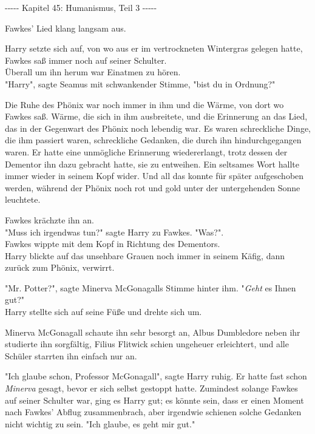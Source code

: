 

\hypertarget{humanismus-teil-3}{%

-\/-\/-\/-\/- Kapitel 45: Humanismus, Teil 3 -\/-\/-\/-\/-

Fawkes' Lied klang langsam aus.

Harry setzte sich auf, von wo aus er im vertrockneten Wintergras gelegen hatte, Fawkes saß immer noch auf seiner Schulter.\\ Überall um ihn herum war Einatmen zu hören.\\ "Harry", sagte Seamus mit schwankender Stimme, "bist du in Ordnung?"

Die Ruhe des Phönix war noch immer in ihm und die Wärme, von dort wo Fawkes saß. Wärme, die sich in ihm ausbreitete, und die Erinnerung an das Lied, das in der Gegenwart des Phönix noch lebendig war. Es waren schreckliche Dinge, die ihm passiert waren, schreckliche Gedanken, die durch ihn hindurchgegangen waren. Er hatte eine unmögliche Erinnerung wiedererlangt, trotz dessen der Dementor ihn dazu gebracht hatte, sie zu entweihen. Ein seltsames Wort hallte immer wieder in seinem Kopf wider. Und all das konnte für später aufgeschoben werden, während der Phönix noch rot und gold unter der untergehenden Sonne leuchtete.

Fawkes krächzte ihn an.\\ "Muss ich irgendwas tun?" sagte Harry zu Fawkes. "Was?".\\ Fawkes wippte mit dem Kopf in Richtung des Dementors.\\ Harry blickte auf das unsehbare Grauen noch immer in seinem Käfig, dann zurück zum Phönix, verwirrt.

"Mr. Potter?", sagte Minerva McGonagalls Stimme hinter ihm. "\emph{Geht} es Ihnen gut?"\\ Harry stellte sich auf seine Füße und drehte sich um.

Minerva McGonagall schaute ihn sehr besorgt an, Albus Dumbledore neben ihr studierte ihn sorgfältig, Filius Flitwick schien ungeheuer erleichtert, und alle Schüler starrten ihn einfach nur an.

"Ich glaube schon, Professor McGonagall", sagte Harry ruhig. Er hatte fast schon \emph{Minerva} gesagt, bevor er sich selbst gestoppt hatte. Zumindest solange Fawkes auf seiner Schulter war, ging es Harry gut; es könnte sein, dass er einen Moment nach Fawkes' Abflug zusammenbrach, aber irgendwie schienen solche Gedanken nicht wichtig zu sein. "Ich glaube, es geht mir gut."

}
